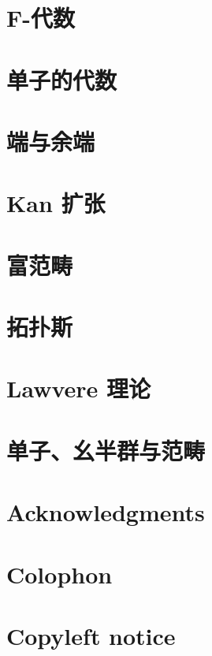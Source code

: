 \chapter{F-代数}\label{f-algebras}


\chapter{单子的代数}\label{algebras-for-monads}


\chapter{端与余端}\label{ends-and-coends}


\chapter{Kan 扩张}\label{kan-extensions}


\chapter{富范畴}\label{enriched-categories}


\chapter{拓扑斯}\label{topoi}


\chapter{Lawvere 理论}\label{lawvere-theories}


\chapter{单子、幺半群与范畴}\label{monads-monoids-categories}


\backmatter

\appendix
{}


\makeatletter\@openrightfalse
\chapter*{Acknowledgments}\label{acknowledgments}


\chapter*{Colophon}\label{colophon}


\chapter*{Copyleft notice}\label{copyleft}

\@openrighttrue\makeatother
\afterpage{\blankpage}
